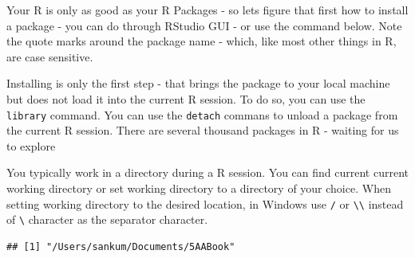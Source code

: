 \documentclass[11pt, letterpaper, twoside]{memoir}\usepackage{knitr}
\begin{document}
Your R is only as good as your R Packages - so lets figure that first how to install a package - you can do through RStudio GUI - or use the command below. Note the quote marks around the package name - which, like most other things in R, are case sensitive.
\begin{knitrout}
\color{fgcolor}\begin{kframe}
\begin{alltt}
\hlstd{(}\hlstd{)}
\end{alltt}
\end{kframe}
\end{knitrout}

Installing is only the first step - that brings the package to your local machine but does not load it into the current R session. To do so, you can use the \texttt{library} command. You can use the \texttt{detach} commans to unload a package from the current R session. There are several thousand packages in R - waiting for us to explore
\begin{knitrout}
\color{fgcolor}\begin{kframe}
\begin{alltt}
\hlopt{:}
\end{alltt}
\end{kframe}
\end{knitrout}

You typically work in a directory during a R session. You can find current current working directory or set working directory to a directory of your choice. 
When setting working directory to the desired location, in Windows use \verb|/| or \verb|\\| instead of \verb|\| character as the separator character. 
\begin{knitrout}
\color{fgcolor}\begin{kframe}
\begin{alltt}
\hlstd{()}
\end{alltt}
\begin{verbatim}
## [1] "/Users/sankum/Documents/5AABook"
\end{verbatim}
\end{kframe}
\end{knitrout}
\begin{knitrout}
\color{fgcolor}\begin{kframe}
\begin{alltt}
\hlstd{(}\hlstd{)}
\end{alltt}
\end{kframe}
\end{knitrout}
\end{document}
